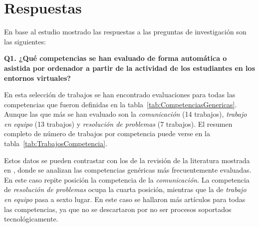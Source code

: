 \pagestyle{fancy}
\section{Respuestas}

En base al estudio mostrado las respuestas a las preguntas de investigación son las siguientes:

\bigskip
\textbf{Q1. ¿Qué competencias se han evaluado de forma automática o asistida por ordenador a partir de la actividad de los estudiantes en los entornos virtuales?}

En esta selección de trabajos se han encontrado evaluaciones para todas las competencias que fueron definidas en la tabla~\ref{tab:CompetenciasGenericas}. Aunque las que más se han evaluado son la \emph{comunicación} (14 trabajos), \emph{trabajo en equipo} (13 trabajos) y \emph{resolución de problemas} (7 trabajos). El resumen completo de número de trabajos por competencia puede verse en la tabla~\ref{tab:TrabajosCompetencia}.

Estos datos se pueden contrastar con los de la revisión de la literatura mostrada en \cite{strijbos2015criteria}, donde se analizan las competencias genéricas más frecuentemente evaluadas. En este caso repite posición la competencia de la \emph{comunicación}. La competencia de \emph{resolución de problemas} ocupa la cuarta posición, mientras que la de \emph{trabajo en equipo} pasa a sexto lugar. En este caso se hallaron más artículos para todas las competencias, ya que no se descartaron por no ser procesos soportados tecnológicamente. 



